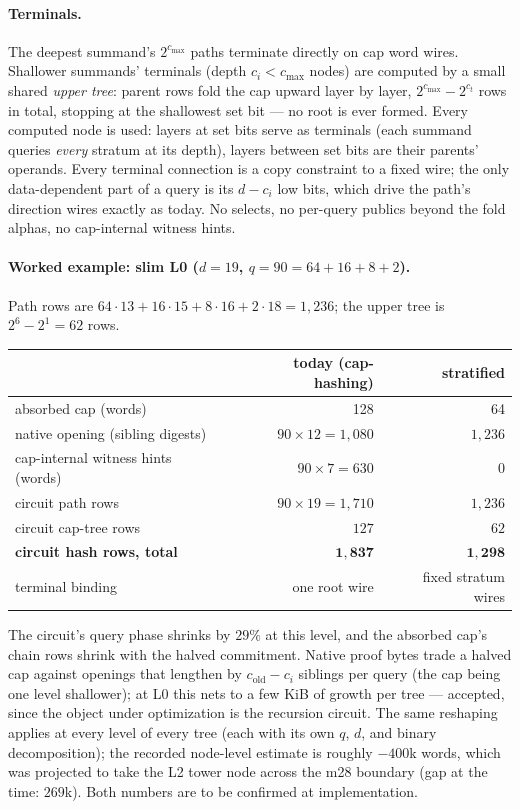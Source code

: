 \documentclass[11pt]{article}
\theoremstyle{definition}
\begin{document}
\paragraph{Terminals.}
The deepest summand's $2^{c_{\max}}$ paths terminate directly on cap
word wires. Shallower summands' terminals (depth $c_i < c_{\max}$
nodes) are computed by a small shared \emph{upper tree}: parent rows
fold the cap upward layer by layer, $2^{c_{\max}} - 2^{c_t}$ rows in
total, stopping at the shallowest set bit --- no root is ever formed.
Every computed node is used: layers at set bits serve as terminals
(each summand queries \emph{every} stratum at its depth), layers
between set bits are their parents' operands. Every terminal
connection is a copy constraint to a fixed wire; the only
data-dependent part of a query is its $d - c_i$ low bits, which drive
the path's direction wires exactly as today. No selects, no per-query
publics beyond the fold alphas, no cap-internal witness hints.

\paragraph{Worked example: slim L0 ($d = 19$, $q = 90 = 64 + 16 + 8
+ 2$).}
Path rows are $64 \cdot 13 + 16 \cdot 15 + 8 \cdot 16 + 2 \cdot 18 =
1{,}236$; the upper tree is $2^6 - 2^1 = 62$ rows.

\begin{center}
\begin{tabular}{lrr}
\toprule
& today (cap-hashing) & stratified \\
\midrule
absorbed cap (words) & 128 & 64 \\
native opening (sibling digests) & $90 \times 12 = 1{,}080$ & $1{,}236$ \\
cap-internal witness hints (words) & $90 \times 7 = 630$ & 0 \\
circuit path rows & $90 \times 19 = 1{,}710$ & $1{,}236$ \\
circuit cap-tree rows & $127$ & $62$ \\
\textbf{circuit hash rows, total} & $\mathbf{1{,}837}$ & $\mathbf{1{,}298}$ \\
terminal binding & one root wire & fixed stratum wires \\
\bottomrule
\end{tabular}
\end{center}

The circuit's query phase shrinks by $29\%$ at this level, and the
absorbed cap's chain rows shrink with the halved commitment. Native
proof bytes trade a halved cap against openings that lengthen by
$c_{\mathrm{old}} - c_i$ siblings per query (the cap being one level
shallower); at L0 this nets to a few KiB of growth per tree ---
accepted, since the object under optimization is the recursion
circuit. The same reshaping applies at every level of every tree
(each with its own $q$, $d$, and binary decomposition); the recorded
node-level estimate is roughly $-400$k words, which was projected to
take the L2 tower node across the m28 boundary (gap at the time:
$269$k). Both numbers are to be confirmed at implementation.
\end{document}
